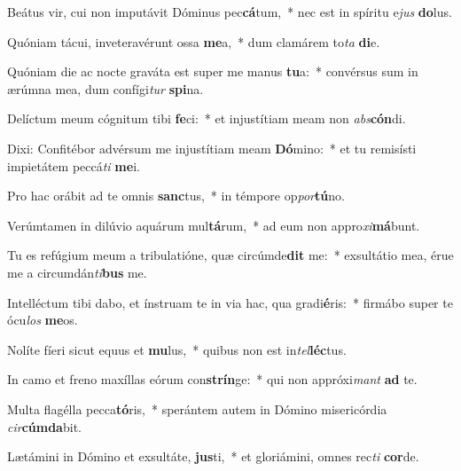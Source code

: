 \item Beátus vir, cui non imputávit Dóminus pec\textbf{cá}tum,~* nec est in spíritu e\textit{jus} \textbf{do}lus.
\item Quóniam tácui, inveteravérunt ossa \textbf{me}a,~* dum clamárem to\textit{ta} \textbf{di}e.
\item Quóniam die ac nocte graváta est super me manus \textbf{tu}a:~* convérsus sum in ærúmna mea, dum confígi\textit{tur} \textbf{spi}na.
\item Delíctum meum cógnitum tibi \textbf{fe}ci:~* et injustítiam meam non \textit{abs}\textbf{cón}di.
\item Dixi: Confitébor advérsum me injustítiam meam \textbf{Dó}mino:~* et tu remisísti impietátem peccá\textit{ti} \textbf{me}i.
\item Pro hac orábit ad te omnis \textbf{sanc}tus,~* in témpore op\textit{por}\textbf{tú}no.
\item Verúmtamen in dilúvio aquárum mul\textbf{tá}rum,~* ad eum non appro\textit{xi}\textbf{má}bunt.
\item Tu es refúgium meum a tribulatióne, quæ circúmde\textbf{dit} me:~* exsultátio mea, érue me a circumdán\textit{ti}\textbf{bus} me.
\item Intelléctum tibi dabo, et ínstruam te in via hac, qua gradi\textbf{é}ris:~* firmábo super te ócu\textit{los} \textbf{me}os.
\item Nolíte fíeri sicut equus et \textbf{mu}lus,~* quibus non est in\textit{tel}\textbf{léc}tus.
\item In camo et freno maxíllas eórum con\textbf{strín}ge:~* qui non appróxi\textit{mant} \textbf{ad} te.
\item Multa flagélla pecca\textbf{tó}ris,~* sperántem autem in Dómino misericórdia \textit{cir}\textbf{cúm}\textbf{da}bit.
\item Lætámini in Dómino et exsultáte, \textbf{jus}ti,~* et gloriámini, omnes rec\textit{ti} \textbf{cor}de.
